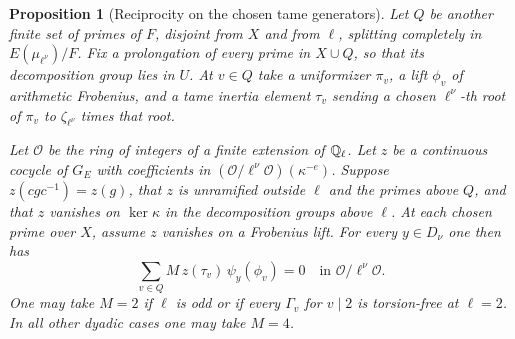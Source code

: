 \documentclass[a4paper,11pt]{article}
\newtheorem{proposition}{Proposition}[section]
\theoremstyle{definition}
\theoremstyle{remark}
\numberwithin{equation}{section}
\begin{document}
\begin{proposition}[Reciprocity on the chosen tame generators]
\leavevmode\label{prop:evenreciprocity712}
Let \(Q\) be another finite set of primes of \(F\), disjoint
from \(X\) and from \(\ell\), splitting completely in
\(E(\mu_{\ell^\nu})/F\). Fix a prolongation of every prime
in \(X\cup Q\), so that its decomposition group lies in
\(U\). At \(v\in Q\) take a uniformizer \(\pi_v\), a lift
\(\phi_v\) of arithmetic Frobenius, and a tame inertia
element \(\tau_v\) sending a chosen \(\ell^\nu\)-th root
of \(\pi_v\) to \(\zeta_{\ell^\nu}\) times that root.

Let \(\mathcal O\) be the ring of integers of a finite extension
of \(\mathbb Q_\ell\). Let \(z\) be a continuous cocycle of \(G_E\)
with coefficients in \((\mathcal O/\ell^\nu\mathcal O)(\kappa^{-e})\).
Suppose \(z(cgc^{-1})=z(g)\), that \(z\) is unramified outside
\(\ell\) and the primes above \(Q\), and that \(z\) vanishes on
\(\ker\kappa\) in the decomposition groups above \(\ell\).
At each chosen prime over \(X\), assume \(z\) vanishes on a
Frobenius lift. For every \(y\in D_\nu\) one then has
\[
             \sum_{v\in Q} M\,z(\tau_v)\,\psi_y(\phi_v)=0
                        \quad\text{in }\mathcal O/\ell^\nu\mathcal O .
\]
One may take \(M=2\) if \(\ell\) is odd or if every
\(\Gamma_v\) for \(v\mid2\) is torsion-free at \(\ell=2\).
In all other dyadic cases one may take \(M=4\).
\end{proposition}
\end{document}
